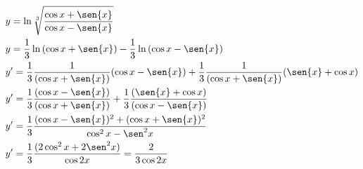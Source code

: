\begin{ex}
\begin{align}
&y=\ln{\sqrt[3]{\frac{\cos{x}+\sen{x}}{\cos{x}-\sen{x}}}}\nonumber\\
&y=\frac{1}{3}\ln{(\cos{x}+\sen{x})}-\frac{1}{3}\ln{(\cos{x}-\sen{x})}\nonumber\\
&y'=\frac{1}{3}\frac{1}{(\cos{x}+\sen{x})}(\cos{x}-\sen{x})+\frac{1}{3}\frac{1}{(\cos{x}+\sen{x})}(\sen{x}+\cos{x})\nonumber\\
&y'=\frac{1}{3}\frac{(\cos{x}-\sen{x})}{(\cos{x}+\sen{x})}+\frac{1}{3}\frac{(\sen{x}+\cos{x})}{(\cos{x}-\sen{x})}\nonumber\\
&y'=\frac{1}{3}\frac{(\cos{x}-\sen{x})^2+(\cos{x}+\sen{x})^2}{\cos^2{x}-\sen^2{x}}\nonumber\\
&y'=\frac{1}{3}\frac{(2\cos^2{x}+2\sen^2{x})}{\cos{2x}}=\frac{2}{3\cos{2x}}\nonumber
\end{align}
\end{ex}